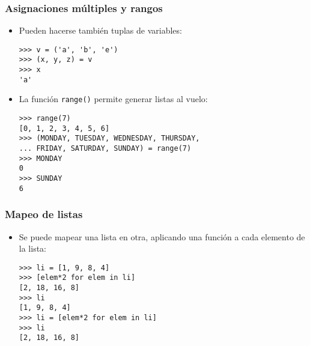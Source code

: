 \begin{frame}[fragile]
\frametitle{Asignaciones múltiples y rangos}

\begin{itemize}
\item Pueden hacerse también tuplas de variables:
\begin{footnotesize}
\begin{verbatim}
>>> v = ('a', 'b', 'e')
>>> (x, y, z) = v 
>>> x
'a'
\end{verbatim}
\end{footnotesize}

\item La función \verb|range()| permite generar listas al vuelo:
\begin{footnotesize}
\begin{verbatim}
>>> range(7)
[0, 1, 2, 3, 4, 5, 6]
>>> (MONDAY, TUESDAY, WEDNESDAY, THURSDAY, 
... FRIDAY, SATURDAY, SUNDAY) = range(7)
>>> MONDAY
0
>>> SUNDAY
6
\end{verbatim}
\end{footnotesize}
\end{itemize}

\end{frame}



\begin{frame}[fragile]
\frametitle{Mapeo de listas}

\begin{itemize}
\item Se puede mapear una lista en otra, aplicando una función a cada
  elemento de la lista:
  \begin{footnotesize}
\begin{verbatim}
>>> li = [1, 9, 8, 4]
>>> [elem*2 for elem in li]      
[2, 18, 16, 8]
>>> li                           
[1, 9, 8, 4]
>>> li = [elem*2 for elem in li] 
>>> li
[2, 18, 16, 8]
\end{verbatim}
  \end{footnotesize}
\end{itemize}
  
\end{frame}


